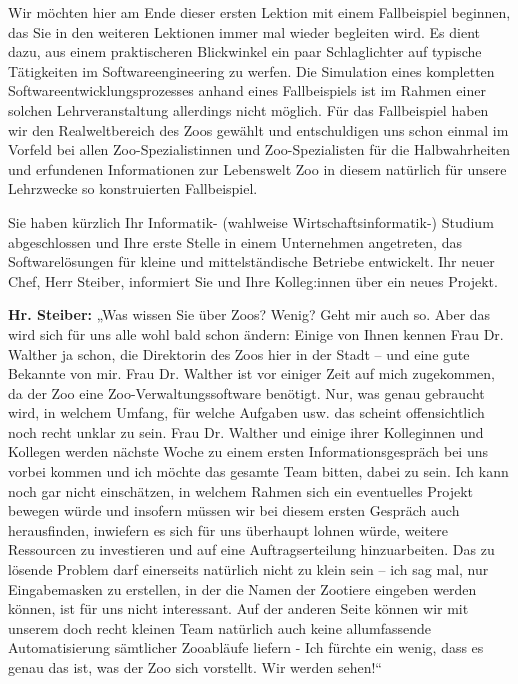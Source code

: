 \cleardoublepage
\FallBeispielZoo
\label{sec:Lektion-1-Zoo}

Wir möchten hier am Ende dieser ersten Lektion mit einem Fallbeispiel beginnen, das Sie in den weiteren Lektionen immer mal wieder begleiten wird. Es dient dazu, aus einem praktischeren Blickwinkel ein paar Schlaglichter auf typische Tätigkeiten im Softwareengineering zu werfen. Die Simulation eines kompletten Software\-entwick\-lungs\-prozesses anhand eines Fallbeispiels ist im Rahmen einer solchen Lehrveranstaltung allerdings nicht möglich. Für das Fallbeispiel haben wir den Real\-weltbereich des Zoos gewählt und entschuldigen uns schon einmal im Vorfeld bei allen Zoo-Spezialistinnen und Zoo-Spezialisten für die Halbwahrheiten und erfundenen Informationen zur Lebenswelt Zoo in diesem natürlich für unsere Lehrzwecke so konstruierten Fallbeispiel.

Sie haben kürzlich Ihr Informatik- (wahlweise Wirtschaftsinformatik-) Studium abgeschlossen und Ihre erste Stelle in einem Unternehmen angetreten, das Softwarelösungen für kleine und mittelständische Betriebe entwickelt. Ihr neuer Chef, Herr Steiber, informiert Sie und Ihre Kolleg:innen über ein neues Projekt.

\textbf{Hr. Steiber:} „Was wissen Sie über Zoos? Wenig? Geht mir auch so. Aber das wird sich für uns alle wohl bald schon ändern: Einige von Ihnen kennen Frau Dr. Walther ja schon, die Direktorin des Zoos hier in der Stadt – und eine gute Bekannte von mir. Frau Dr. Walther ist vor einiger Zeit auf mich zugekommen, da der Zoo eine Zoo-Verwaltungssoftware benötigt. Nur, was genau gebraucht wird, in welchem Umfang, für welche Aufgaben usw. das scheint offensichtlich noch recht unklar zu sein. Frau Dr. Walther und einige ihrer Kolleginnen und Kollegen werden nächste Woche zu einem ersten Informationsgespräch bei uns vorbei kommen und ich möchte das gesamte Team bitten, dabei zu sein. Ich kann noch gar nicht einschätzen, in welchem Rahmen sich ein eventuelles Projekt bewegen würde und insofern müssen wir bei diesem ersten Gespräch auch herausfinden, inwiefern es sich für uns überhaupt lohnen würde, weitere Ressourcen zu investieren und auf eine Auftragserteilung hinzuarbeiten. Das zu lösende Problem darf einerseits natürlich nicht zu klein sein – ich sag mal, nur Eingabemasken zu erstellen, in der die Namen der Zootiere eingeben werden können, ist für uns nicht interessant. Auf der anderen Seite können wir mit unserem doch recht kleinen Team natürlich auch keine allumfassende Automatisierung sämtlicher Zooabläufe liefern - Ich fürchte ein wenig, dass es genau das ist, was der Zoo sich vorstellt. Wir werden sehen!“

